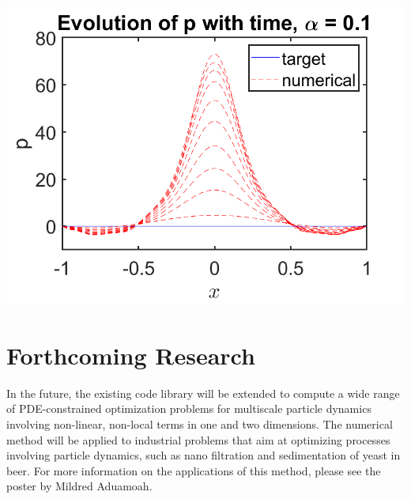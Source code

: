\documentclass[a0,portrait]{a0poster}
\begin{document}
\begin{multicols}{2}
\begin{center}
		\includegraphics[scale=0.75]{qalpha01.png}
		\vspace{-10pt}
\label{Result1}
\end{center}

\section*{Forthcoming Research}

In the future, the existing code library \cite{GoddardPseudospectralCode1} will be extended to compute a wide range of PDE-constrained optimization problems for multiscale particle dynamics involving non-linear, non-local terms in one and two dimensions. 
The numerical method will be applied to industrial problems that aim at optimizing processes involving particle dynamics, such as nano filtration and sedimentation of yeast in beer.
For more information on the applications of this method, please see the poster by Mildred Aduamoah.
\thispagestyle{empty}




\end{multicols}
\end{document}
